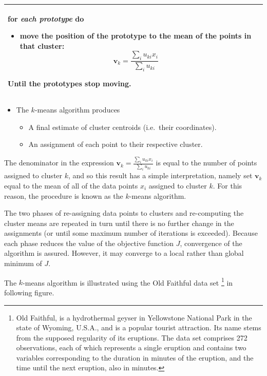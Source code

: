\documentclass[]{book}
\providecommand{\tightlist}{%
  \setlength{\itemsep}{0pt}\setlength{\parskip}{0pt}}
\let\rmarkdownfootnote\footnote%
\def\footnote{\protect\rmarkdownfootnote}
\newenvironment{rmdblock}[1]
  {\begin{shaded*}
  \begin{itemize}
  \renewcommand{\labelitemi}{
    \raisebox{-.7\height}[0pt][0pt]{
      {\setkeys{Gin}{width=2em,keepaspectratio}\texttt{[image: img/icons/\#1]}}
    }
  }
  \item
  }
  {
  \end{itemize}
  \end{shaded*}
  }
\newenvironment{rmdinsight}
  {\begin{rmdblock}{insight}}
  {\end{rmdblock}}
\begin{document}
\begin{longtable}[]{@{}ll@{}}
\begin{minipage}[t]{0.48\columnwidth}
\textbf{for} \emph{each prototype} \textbf{do}

\begin{itemize}
\tightlist
\item
  move the position of the prototype to the mean of the points in that
  cluster: \[\mathbf{v}_k = \frac{\sum_i u_{ki} x_i}{\sum_i u_{ki}}\]
\end{itemize}

Until the prototypes stop moving.\strut
\end{minipage}\tabularnewline
\bottomrule
\end{longtable}

\begin{rmdinsight}
The \(k\)-means algorithm produces

\begin{itemize}
\tightlist
\item
  A final estimate of cluster centroids (i.e.~their coordinates).
\item
  An assignment of each point to their respective cluster.
\end{itemize}
\end{rmdinsight}

The denominator in the expression
\(\mathbf{v}_k = \frac{\sum_i u_{ki} x_i}{\sum_i u_{ki}}\) is equal to
the number of points assigned to cluster \(k\), and so this result has a
simple interpretation, namely set \(\mathbf{v}_k\) equal to the mean of
all of the data points \(x_i\) assigned to cluster \(k\). For this
reason, the procedure is known as the \(k\)-means algorithm.

The two phases of re-assigning data points to clusters and re-computing
the cluster means are repeated in turn until there is no further change
in the assignments (or until some maximum number of iterations is
exceeded). Because each phase reduces the value of the objective
function \(J\), convergence of the algorithm is assured. However, it may
converge to a local rather than global minimum of \(J\).

The \(k\)-means algorithm is illustrated using the Old Faithful data set
\footnote{Old Faithful, is a hydrothermal geyser in Yellowstone National
  Park in the state of Wyoming, U.S.A., and is a popular tourist
  attraction. Its name stems from the supposed regularity of its
  eruptions. The data set comprises 272 observations, each of which
  represents a single eruption and contains two variables corresponding
  to the duration in minutes of the eruption, and the time until the
  next eruption, also in minutes.} in following figure.
\end{document}
